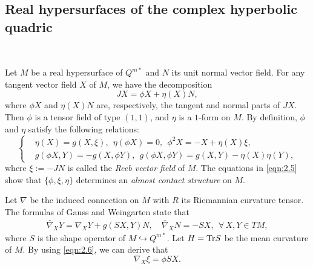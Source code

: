\documentclass[reqno]{amsart}%
\theoremstyle{definition}
\numberwithin{equation}{section}
\begin{document}
\subsection{Real hypersurfaces of the complex hyperbolic quadric}\label{sect:2.2}~

Let $M$ be a real hypersurface of $Q^{m*}$ and $N$ its unit normal vector field. For any
tangent vector field $X$ of $M$, we have the decomposition
%
\begin{equation}\label{eqn:2.4}
JX=\phi X+ \eta(X)N,
\end{equation}
%
where $\phi X$ and $\eta(X)N$ are, respectively, the tangent and normal parts of
$JX$. Then $\phi$ is a tensor field of type $(1,1)$, and $\eta$ is a $1$-form on $M$.
By definition, $\phi$ and $\eta$ satisfy the following relations:
%
\begin{equation}\label{eqn:2.5}
\left\{
\begin{aligned}
&\eta(X)=g(X,\xi),\ \ \eta(\phi X)=0,\ \ \phi^2X=-X+\eta(X)\xi,\\
&g(\phi X,Y)=-g(X,\phi Y),\ \ g(\phi X,\phi Y)=g(X,Y)-\eta(X)\eta(Y),
\end{aligned}\right.
\end{equation}
%
where $\xi:=-JN$ is called the {\it Reeb vector field} of $M$. The equations in
\eqref{eqn:2.5} show that $\{\phi,\xi,\eta\}$ determines an {\it almost contact
structure} on $M$.

Let $\nabla$ be the induced connection on $M$ with $R$ its Riemannian curvature
tensor. The formulas of Gauss and Weingarten state that
%
\begin{equation}\label{eqn:2.6}
\begin{split}
\bar \nabla_X Y=\nabla_X Y + g(SX,Y)N,\quad \bar \nabla_X N=-
S X , \ \ \forall\, X,Y \in TM,
\end{split}
\end{equation}
%
where $S$ is the shape operator of $M\hookrightarrow Q^{m*}$. Let $H={\rm Tr}S$
be the mean curvature of $M$. By using \eqref{eqn:2.6},
we can derive that
%
\begin{equation}\label{eqn:2.7}
\nabla_X \xi=\phi SX.
\end{equation}
\end{document}
